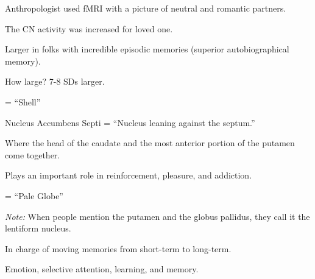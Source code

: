 \begin{coloredlist}
\begin{coloredlist}
\begin{coloredlist}
\begin{coloredlist}
\begin{coloredlist}
\begin{coloredlist}
                        \item Anthropologist used fMRI with a picture of neutral and romantic partners.
                        \item The CN activity was increased for loved one.
                    \end{coloredlist}
                \end{coloredlist}
                \item Larger in folks with incredible episodic memories (superior autobiographical memory).
                \begin{coloredlist}
                    \item How large? 7-8 SDs larger.
                \end{coloredlist}
            \end{coloredlist}
            \item {} = ``Shell''
            \item {}
            \begin{coloredlist}
                \item Nucleus Accumbens Septi = ``Nucleus leaning against the septum.''
                \begin{coloredlist}
                    \item Where the head of the caudate and the most anterior portion of the putamen come together.
                    \item Plays an important role in reinforcement, pleasure, and addiction.
                \end{coloredlist}
            \end{coloredlist}
        \end{coloredlist}
        \item {} = ``Pale Globe''
        \item \textit{Note:} When people mention the putamen and the globus pallidus, they call it the lentiform nucleus.
    \end{coloredlist}
    \item {}
    \begin{coloredlist}
        \item {}
        \begin{coloredlist}
            \item In charge of moving memories from short-term to long-term.
            \item Emotion, selective attention, learning, and memory.

\end{coloredlist}
\end{coloredlist}
\end{coloredlist}
